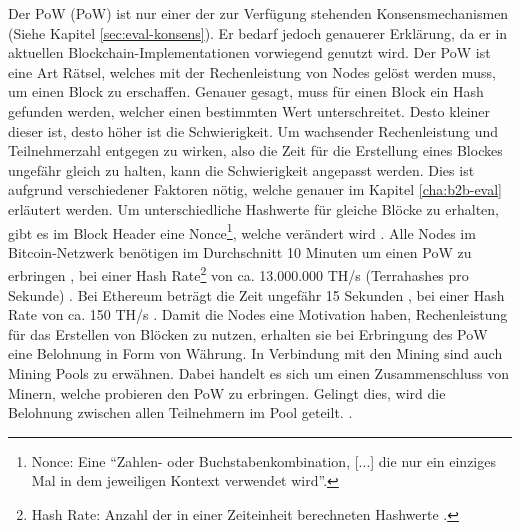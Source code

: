 Der PoW (PoW) ist nur einer der zur Verfügung stehenden Konsensmechanismen (Siehe Kapitel \ref{sec:eval-konsens}). Er bedarf jedoch genauerer Erklärung, da er in aktuellen Blockchain-Implementationen vorwiegend genutzt wird. Der PoW ist eine Art Rätsel, welches mit der Rechenleistung von Nodes gelöst werden muss, um einen Block zu erschaffen. Genauer gesagt, muss für einen Block ein Hash gefunden werden, welcher einen bestimmten Wert unterschreitet. Desto kleiner dieser ist, desto höher ist die Schwierigkeit. Um wachsender Rechenleistung und Teilnehmerzahl entgegen zu wirken, also die Zeit für die Erstellung eines Blockes ungefähr gleich zu halten, kann die Schwierigkeit angepasst werden. Dies ist aufgrund verschiedener Faktoren nötig, welche genauer im Kapitel \ref{cha:b2b-eval} erläutert werden. Um unterschiedliche Hashwerte für gleiche Blöcke zu erhalten, gibt es im Block Header eine Nonce\footnote{Nonce: Eine ``Zahlen- oder Buchstabenkombination, [...] die nur ein einziges Mal in dem jeweiligen Kontext verwendet wird''\cite{WikipediaNonce2017}.}, welche verändert wird \cite{NakamotoBitcoinPeertoPeerElectronic2008}. Alle Nodes im Bitcoin-Netzwerk benötigen im Durchschnitt 10 Minuten um einen PoW zu erbringen \cite{AntonopoulosMasteringbitcoin2015}, bei einer Hash Rate\footnote{Hash Rate: Anzahl der in einer Zeiteinheit berechneten Hashwerte \cite{BitcoinTeamBitcoinGlossar}.} von ca. 13.000.000 TH/s (Terrahashes pro Sekunde) \cite{EtherscanEthereumNetworkHashRate}. Bei Ethereum beträgt die Zeit ungefähr 15 Sekunden \cite{EtherscanEthereumAverageBlockTime}, bei einer Hash Rate von ca. 150 TH/s \cite{EtherscanEthereumNetworkHashRate}. Damit die Nodes eine Motivation haben, Rechenleistung für das Erstellen von Blöcken zu nutzen, erhalten sie bei Erbringung des PoW eine Belohnung in Form von Währung. In Verbindung mit den Mining sind auch Mining Pools zu erwähnen. Dabei handelt es sich um einen Zusammenschluss von Minern, welche probieren den PoW zu erbringen. Gelingt dies, wird die Belohnung zwischen allen Teilnehmern im Pool geteilt.  \cite{NakamotoBitcoinPeertoPeerElectronic2008} \cite{EthereumTeamEthereumWhitePaper2017}. 

